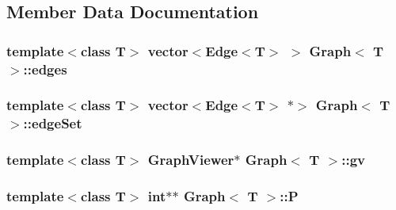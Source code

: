 \subsection{Member Data Documentation}
\subsubsection[{\texorpdfstring{edges}{edges}}]{\setlength{\rightskip}{0pt plus 5cm}template$<$class T$>$ vector$<${\bf Edge}$<$T$>$ $>$ {\bf Graph}$<$ T $>$\+::edges\hspace{0.3cm}{\ttfamily [private]}}\hypertarget{classGraph_afbdd278e1f3cb43805ef769404a3afd1}{}\label{classGraph_afbdd278e1f3cb43805ef769404a3afd1}
\subsubsection[{\texorpdfstring{edge\+Set}{edgeSet}}]{\setlength{\rightskip}{0pt plus 5cm}template$<$class T$>$ vector$<${\bf Edge}$<$T$>$ $\ast$$>$ {\bf Graph}$<$ T $>$\+::edge\+Set\hspace{0.3cm}{\ttfamily [private]}}\hypertarget{classGraph_a83ebb4fdb2b6a21d4112d4d179230e95}{}\label{classGraph_a83ebb4fdb2b6a21d4112d4d179230e95}
\subsubsection[{\texorpdfstring{gv}{gv}}]{\setlength{\rightskip}{0pt plus 5cm}template$<$class T$>$ {\bf Graph\+Viewer}$\ast$ {\bf Graph}$<$ T $>$\+::gv\hspace{0.3cm}{\ttfamily [private]}}\hypertarget{classGraph_afbbcf226b738a3dd936173881991b31e}{}\label{classGraph_afbbcf226b738a3dd936173881991b31e}
\subsubsection[{\texorpdfstring{P}{P}}]{\setlength{\rightskip}{0pt plus 5cm}template$<$class T$>$ int$\ast$$\ast$ {\bf Graph}$<$ T $>$\+::P\hspace{0.3cm}{\ttfamily [private]}}\hypertarget{classGraph_a8198bca6e66c0c95e24062e40813ebba}{}\label{classGraph_a8198bca6e66c0c95e24062e40813ebba}
